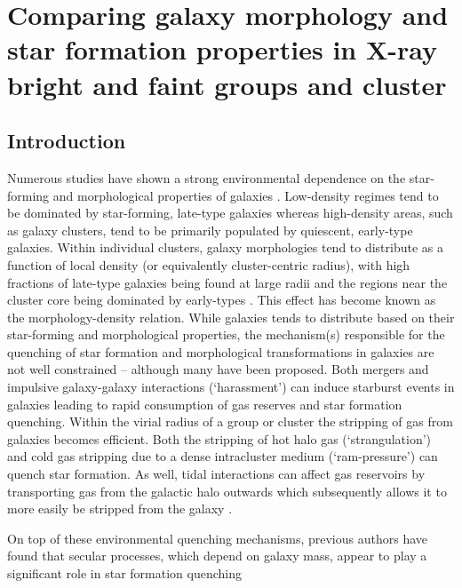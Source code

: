 \chapter{Comparing galaxy morphology and star formation properties in
  X-ray bright and faint groups and cluster}
\label{chap:xray}

\section{Introduction}
\label{sec:intro_x}

Numerous studies have shown a strong environmental dependence on the
star-forming and morphological properties of galaxies
\citep[e.g.][]{butcher1978, dressler1980, postman1984, dressler1999,
  blanton2005b, wetzel2012}.  Low-density regimes tend to be dominated
by star-forming, late-type galaxies whereas high-density areas, such
as galaxy clusters, tend to be primarily populated by quiescent,
early-type galaxies.  Within individual clusters, galaxy morphologies
tend to distribute as a function of local density (or equivalently
cluster-centric radius), with high fractions of late-type galaxies
being found at large radii and the regions near the cluster core being
dominated by early-types \citep[e.g.][]{dressler1980, postman1984,
  postman2005}.  This effect has become known as the
morphology-density relation.  While galaxies tends to distribute based
on their star-forming and morphological properties, the mechanism(s)
responsible for the quenching of star formation and morphological
transformations in galaxies are not well constrained -- although many
have been proposed.  Both mergers and impulsive galaxy-galaxy
interactions (`harassment') \citep[e.g.][]{moore1996} can induce
starburst events in galaxies leading to rapid consumption of gas
reserves and star formation quenching.  Within the virial radius of a
group or cluster the stripping of gas from galaxies becomes
efficient.  Both the stripping of hot halo gas (`strangulation')
\citep[e.g.][]{kawata2008} and cold gas stripping due to a dense
intracluster medium (`ram-pressure') \citep[e.g.][]{gunn1972} can
quench star formation.  As well, tidal interactions can affect gas
reservoirs by transporting gas from the galactic halo outwards which
subsequently allows it to more easily be stripped from the galaxy
\citep{chung2007}.
\par
On top of these environmental quenching mechanisms, previous authors
have found that secular processes, which depend on galaxy mass, appear
to play a significant role in star formation quenching
